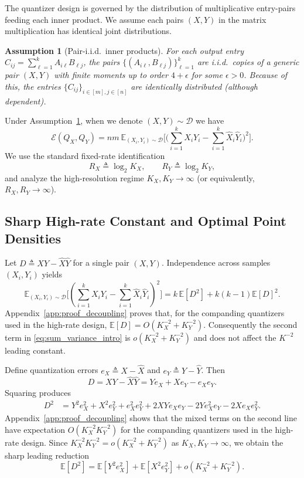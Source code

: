 \documentclass{article}
\newtheorem{assumption}{Assumption}
\newcommand{\E}{\mathbb{E}}
\newcommand{\defeq}{\triangleq}
\newcommand{\logtwo}{\log_2}
\begin{document}
The quantizer design is governed by the distribution of multiplicative entry-pairs feeding each inner product. We assume each pairs $(X, Y)$ in the matrix multiplication has identical joint distributions.

\begin{assumption}[Pair-i.i.d.\ inner products]\label{as:pair_iid}
For each output entry $C_{ij}=\sum_{\ell=1}^k A_{i\ell}B_{\ell j}$, the pairs $\{(A_{i\ell},B_{\ell j})\}_{\ell=1}^k$ are i.i.d.\ copies of a generic pair $(X,Y)$ with finite moments up to order $4+\epsilon$ for some $\epsilon>0$. Because of this, the entries $\{C_{ij}\}_{i\in [m], j \in [n]}$ are identically distributed (although dependent).
\end{assumption}

Under Assumption~\ref{as:pair_iid}, when we denote $(X, Y) \sim \mathcal{D}$ we have 
\[
\mathcal{E}(Q_X, Q_Y) = nm\ \mathbb{E}_{(X_i, Y_i)\sim \mathcal{D}} \Big[\big(\sum_{i=1}^{k}X_iY_i - \sum_{i=1}^{k} \hat{X}_i\hat{Y}_i\big)^2\Big].
\]
We use the standard fixed-rate identification
\[
R_X\defeq \logtwo K_X,\qquad R_Y\defeq \logtwo K_Y,
\]
and analyze the high-resolution regime $K_X,K_Y\to\infty$ (or equivalently, $R_X,R_Y\to\infty$).

\subsection{Sharp High-rate Constant and Optimal Point Densities}

Let $D\defeq XY-\widehat X\widehat Y$ for a single pair $(X,Y)$. Independence across samples $(X_i, Y_i)$ yields
\begin{equation}\label{eq:sum_variance_intro}
\E_{(X_i, Y_i)\sim \mathcal{D}} \big[(\sum_{i=1}^{k}X_iY_i - \sum_{i=1}^{k} \hat{X}_i\hat{Y}_i)^2\big]
= k\,\E[D^2] + k(k-1)\E[D]^2.
\end{equation}
Appendix~\ref{app:proof_decoupling} proves that, for the companding quantizers used in the high-rate design, $\E[D]=O(K_X^{-2}+K_Y^{-2})$. Consequently the second term in \eqref{eq:sum_variance_intro} is $o(K_X^{-2}+K_Y^{-2})$ and does not affect the $K^{-2}$ leading constant.

Define quantization errors $e_X\defeq X-\widehat X$ and $e_Y\defeq Y-\widehat Y$. Then
\begin{equation}\label{eq:bilinear_error_intro}
D=XY-\widehat X\widehat Y
=Y e_X + X e_Y - e_X e_Y.
\end{equation}
Squaring produces
\begin{align}
D^2
&=Y^2e_X^2 + X^2e_Y^2 + e_X^2e_Y^2
+2XYe_Xe_Y -2Ye_X^2e_Y -2Xe_Xe_Y^2. \label{eq:D2_expand_intro}
\end{align}
Appendix~\ref{app:proof_decoupling} shows that the mixed terms on the second line have expectation $O(K_X^{-2}K_Y^{-2})$ for the companding quantizers used in the high-rate design. Since $K_X^{-2}K_Y^{-2}=o(K_X^{-2}+K_Y^{-2})$ as $K_X,K_Y\to\infty$, we obtain the sharp leading reduction
\begin{equation}\label{eq:leading_D2_intro}
\E[D^2] = \E[Y^2e_X^2]+\E[X^2e_Y^2] + o(K_X^{-2}+K_Y^{-2}).
\end{equation}
\end{document}
